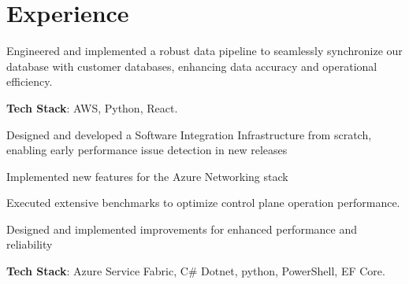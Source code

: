 \documentclass[letterpaper]{deedy-resume} %
\begin{document}
\begin{minipage}[t]{0.66\textwidth} %


\section{Experience}


\vspace{\topsep} %
\begin{tightitemize}
\item Engineered and implemented a robust data pipeline to seamlessly synchronize our database with customer databases, enhancing data accuracy and operational efficiency.
\item \textbf{Tech Stack}: AWS, Python, React.
\end{tightitemize}

\sectionspace %


\begin{tightitemize}
\item Designed and developed a Software Integration Infrastructure from scratch, enabling early performance issue detection in new releases
\item Implemented new features for the Azure Networking stack
\item Executed extensive benchmarks to optimize control plane operation performance.
\item Designed and implemented improvements for enhanced performance and reliability
\item \textbf{Tech Stack}: Azure Service Fabric, C\# Dotnet, python, PowerShell, EF Core.
\end{tightitemize}

\sectionspace %



\end{minipage}
\end{document}
